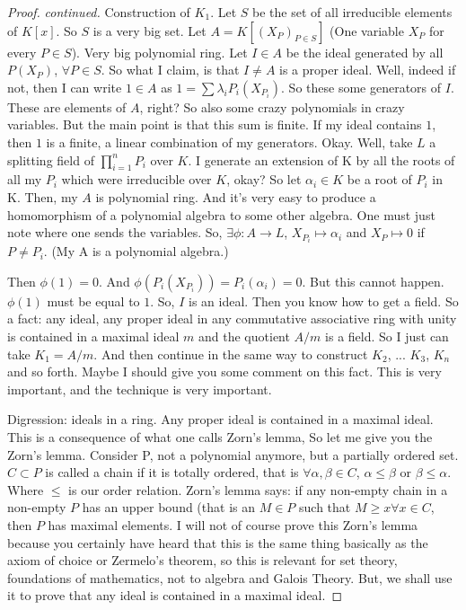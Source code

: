 \begin{proof} \textit{continued.} 
Construction of $K_1$. Let $S$ be the set of all irreducible elements of $K[x]$. So $S$ is a very big set. Let $A=K[(X_P)_{P\in S}]$ (One variable $X_P$ for every $P \in S$). Very big polynomial ring. Let $I\in A$ be the ideal generated by all $P(X_P)$, $\forall P \in S$. So what I claim, is that $I\neq A$ is a proper ideal. Well, indeed if not, then I can write $1\in A$ as $1=\sum \lambda_i P_i(X_{P_i})$. So these some generators of $I$. These are elements of $A$, right? So also some crazy polynomials in crazy variables. But the main point is that this sum is finite. If my ideal contains $1$, then $1$ is a finite, a linear combination of my generators. Okay. Well, take $L$ a splitting field of $\prod_{i=1}^{n}P_i$ over $K$. I generate an extension of K by all the roots of all my $P_i$ which were irreducible over $K$, okay? So let $\alpha_i\in K$ be a root of $P_i$ in K. Then, my $A$ is polynomial ring. And it's very easy to produce a homomorphism of a polynomial algebra to some other algebra. One must just note where one sends the variables. So, $\exists \phi: A \to L$, $X_{P_i}\mapsto \alpha_i$ and $X_{P}\mapsto 0$ if $P\neq P_i$. (My A is a polynomial algebra.)

Then $\phi(1)=0$.  And $\phi(P_i(X_{P_i}))=P_i(\alpha_i)=0$. But this cannot happen. $\phi(1)$ must be equal to $1$. So, $I$ is an ideal. Then you know how to get a field.  So a fact: any ideal, any proper ideal in any commutative associative ring with unity is contained in a maximal ideal $m$ and the quotient $A/m$ is a field. So I just can take $K_1 = A/m$. And then continue in the same way to construct $K_2$, ... $K_3$, $K_n$ and so forth. Maybe I should give you some comment on this fact. This is very important, and
the technique is very important.

Digression: ideals in a ring. Any proper ideal is contained in a maximal ideal. This is a consequence of what one calls Zorn's lemma, So let me give you the Zorn's lemma. Consider P, not a polynomial anymore, but a partially ordered set. $C\subset P$ is called a chain if it is totally ordered, that is $\forall \alpha , \beta \in C$, $\alpha \leq \beta$ or $\beta \leq \alpha$.  Where $\leq$ is our order relation. Zorn's lemma says: if any non-empty chain in a non-empty $P$ has an upper bound (that is an $M\in P$ such that $M\geq x \forall x \in C$, then $P$ has maximal elements. I will not of course prove this Zorn's lemma because you certainly have heard that this is the same thing basically as the axiom of choice or Zermelo's theorem, so this is relevant for set theory, foundations of mathematics, not to algebra and Galois Theory. But, we shall use it to prove that any ideal is contained in a maximal ideal. 


\end{proof}
